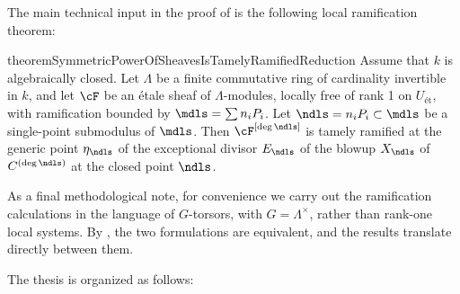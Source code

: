 

The main technical input in the proof of  is the following local ramification theorem:

\begin{restatable}{theorem}{SymmetricPowerOfSheavesIsTamelyRamifiedReduction}\label{theorem:SymmetricPowerOfSheavesIsTamelyRamifiedReduction}
     Assume that $k$ is algebraically closed.
     Let $\Lambda$ be a finite commutative ring of cardinality invertible in $k$, and let $\cF$ be an \'etale sheaf of $\Lambda$-modules, locally free of rank 1 on $U_{\text{\'et}}$, with ramification bounded by $\mdls = \sum n_i P_i$. 
     Let $\ndls = n_i P_i \subset \mdls$ be a single-point submodulus of $\mdls$.
     Then $\cF^{[\deg \ndls]}$ is tamely ramified at the generic point $\eta_\ndls$ of the exceptional divisor $E_\ndls$ 
     of the blowup $X_{\ndls}$ of $C^{(\deg \ndls)}$ at the closed point $\ndls$.
\end{restatable}

As a final methodological note, for convenience we carry out the ramification calculations in the language of $G$-torsors, with $G=\Lambda^\times$, rather than rank-one local systems.
By , the two formulations are equivalent, and the results translate directly between them.

The thesis is organized as follows:

